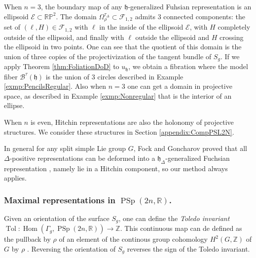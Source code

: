 \documentclass[reqno,10pt]{amsart}
\theoremstyle{plain}
\theoremstyle{definition}
\theoremstyle{remark}
\newcommand{\type}{\tau}
\newcommand{\R}{\mathbb{R}}
\DeclareMathOperator{\Tol}{Tol}
\DeclareMathOperator{\Hom}{Hom}
\DeclareMathOperator{\PSp}{PSp}
\newcommand{\ie}{namely }
\begin{document}
When $n=3$, the boundary map of any $\mathfrak{h}$-generalized Fuhsian representation is an ellipsoid $\mathcal{E}\subset \mathbb{RP}^2$. The domain $\Omega^{\type_\Delta}_\rho\subset\mathcal{F}_{1,2}$ admits $3$ connected components: the set of $(\ell,H)\in \mathcal{F}_{1,2}$ with $\ell$ in the inside of the ellipsoid $\mathcal{E}$, with $H$ completely outside of the ellipsoid, and finally with $\ell$ outside the ellipsoid and $H$ crossing the ellipsoid in two points.
 One can see that the quotient of this domain is the union of three copies of the projectivization of the tangent bundle of $S_g$. If we apply Theorem \ref{thm:FoliationDoD} to $u_\mathfrak{h}$, we obtain a fibration where the model fiber $\mathcal{B}^\type(\mathfrak{h})$ is the union of $3$ circles described in Example \ref{exmp:PencilsRegular}. 
 Also when $n=3$ one can get a domain in projective space, as described in Example \ref{exmp:Nonregular} that is the interior of an ellipse.

\medskip

When $n$ is even, Hitchin representations are also the holonomy of projective structures. We consider these structures in Section \ref{appendix:CompPSL2N}.


\medskip

In general for any split simple Lie group $G$, Fock and Goncharov proved that all $\Delta$-positive representations can be deformed into a $\mathfrak{h}_\Delta$-generalized Fuchsian representation \cite{FockGoncharov}, \ie lie in a Hitchin component, so our method always applies.

\subsubsection{Maximal representations in \texorpdfstring{$\PSp(2n,\R)$}{PSp(2n,R)}.}
Given an orientation of the surface $S_g$, one can define the \emph{Toledo invariant} $\Tol:\Hom(\Gamma_g, \PSp(2n,\R))\to \mathbb{Z}$. This continuous map can de defined as the pullback by $\rho$ of an element of the continous group cohomology $H^2(G,\mathbb{Z})$ of $G$ by $\rho$ \cite{BurgerIozziWienhard}. Reversing the orientation of $S_g$ reverses the sign of the Toledo invariant.

\medskip
\end{document}

